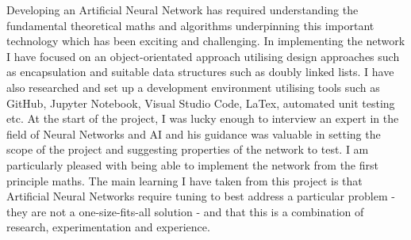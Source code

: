 \documentclass[./project-report/src/latex/project-report.tex]{subfiles}
\begin{document}
Developing an Artificial Neural Network has required understanding the fundamental theoretical maths and algorithms underpinning this important technology which has been 
exciting and challenging. In implementing the network I have focused on an object-orientated approach utilising design approaches such as encapsulation and suitable data 
structures such as doubly linked lists. I have also researched and set up a development environment utilising tools such as GitHub, Jupyter Notebook, Visual Studio Code, 
LaTex, automated unit testing etc. At the start of the project, I was lucky enough to interview an expert in the field of Neural Networks and AI and his guidance was valuable 
in setting the scope of the project and suggesting properties of the network to test. I am particularly pleased with being able to implement the network from the first 
principle maths. The main learning I have taken from this project is that Artificial Neural Networks require tuning to best address a particular problem - they are not a 
one-size-fits-all solution - and that this is a combination of research, experimentation and experience.

\pagebreak
\end{document}
